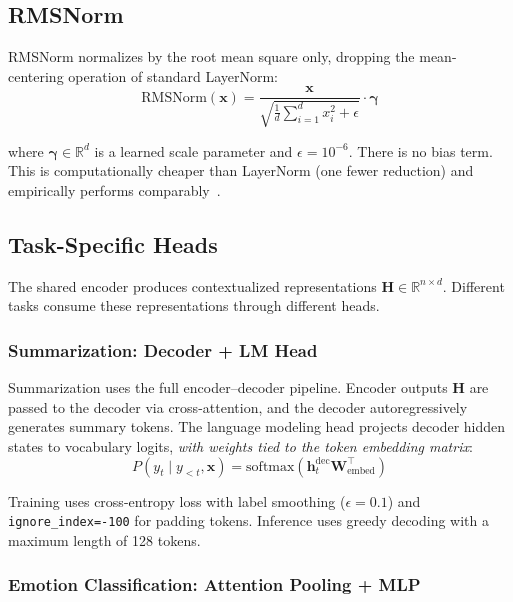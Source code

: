 \documentclass[11pt,a4paper]{article}
\newcommand{\rmsnorm}{\text{RMSNorm}}
\newcommand{\softmax}{\text{softmax}}
\renewcommand{\R}{\mathbb{R}}
\begin{document}
\subsection{RMSNorm}

RMSNorm normalizes by the root mean square only, dropping the mean-centering operation of standard LayerNorm:
\begin{equation}
    \rmsnorm(\bm{x}) = \frac{\bm{x}}{\sqrt{\frac{1}{d}\sum_{i=1}^{d} x_i^2 + \epsilon}} \cdot \bm{\gamma}
\end{equation}

where $\bm{\gamma} \in \R^d$ is a learned scale parameter and $\epsilon = 10^{-6}$.
There is no bias term.
This is computationally cheaper than LayerNorm (one fewer reduction) and empirically performs comparably~\citep{zhang2019root}.

\subsection{Task-Specific Heads}
\label{sec:heads}

The shared encoder produces contextualized representations $\bm{H} \in \R^{n \times d}$.
Different tasks consume these representations through different heads.

\subsubsection{Summarization: Decoder + LM Head}

Summarization uses the full encoder--decoder pipeline.
Encoder outputs $\bm{H}$ are passed to the decoder via cross-attention, and the decoder autoregressively generates summary tokens.
The language modeling head projects decoder hidden states to vocabulary logits, \emph{with weights tied to the token embedding matrix}:
\begin{equation}
    P(y_t \mid y_{<t}, \bm{x}) = \softmax(\bm{h}_t^{\text{dec}} \bm{W}_\text{embed}^\top)
\end{equation}

Training uses cross-entropy loss with label smoothing ($\epsilon = 0.1$) and \texttt{ignore\_index=-100} for padding tokens.
Inference uses greedy decoding with a maximum length of 128 tokens.

\subsubsection{Emotion Classification: Attention Pooling + MLP}
\label{sec:emotion_head}
\end{document}
